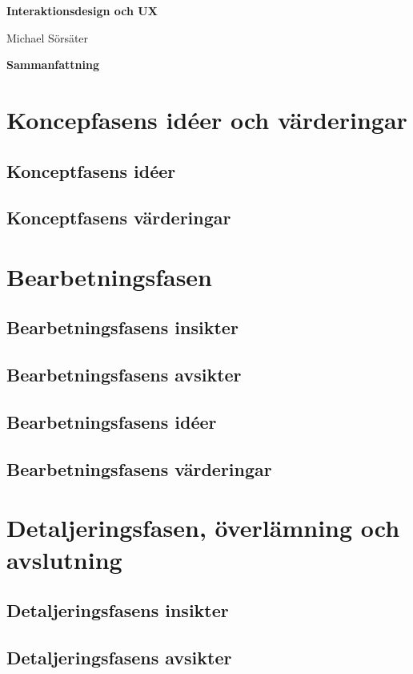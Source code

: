 \documentclass[a4paper,12pt]{article}
\begin{document}
\begin{center}
    \Huge
    \textbf{Interaktionsdesign och UX}

    \vspace{0.3cm}
    \Large
    Michael Sörsäter
    
    \vspace{0.9cm}
    \textbf{Sammanfattning}
\end{center}

\section{Koncepfasens idéer och värderingar}
\subsection{Konceptfasens idéer}
\subsection{Konceptfasens värderingar}

\section{Bearbetningsfasen}
\subsection{Bearbetningsfasens insikter}
\subsection{Bearbetningsfasens avsikter}
\subsection{Bearbetningsfasens idéer}
\subsection{Bearbetningsfasens värderingar}

\section{Detaljeringsfasen, överlämning och avslutning}
\subsection{Detaljeringsfasens insikter}
\subsection{Detaljeringsfasens avsikter}
\end{document}
